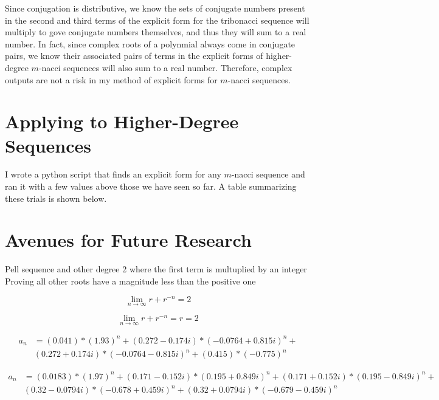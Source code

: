 \documentclass[11pt]{article}
\begin{document}
Since conjugation is distributive, we know the sets of conjugate numbers present in the second and third terms of the explicit form for the tribonacci sequence will multiply to gove conjugate numbers themselves, and thus they will sum to a real number. In fact, since complex roots of a polynmial always come in conjugate pairs, we know their associated pairs of terms in the explicit forms of higher-degree \(m\)-nacci sequences will also sum to a real number. Therefore, complex outputs are not a risk in my method of explicit forms for \(m\)-nacci sequences.



\section{Applying to Higher-Degree Sequences}
I wrote a python script that finds an explicit form for any \(m\)-nacci sequence and ran it with a few values above those we have seen so far. A table summarizing these trials is shown below. 


\section{Avenues for Future Research}
Pell sequence and other degree 2 where the first term is multuplied by an integer 
Proving all other roots have a magnitude less than the positive one

\newpage 

\[\lim_{n\to\infty}r+r^{-n}=2\]

\[\lim_{n\to\infty}r+r^{-n}=r=2\]

\begin{align*}
    a_n &= (0.041)*(1.93)^n + (0.272 - 0.174i)*(-0.0764 + 0.815i)^n + \\ &(0.272 + 0.174i)*(-0.0764 - 0.815i)^n + (0.415)*(-0.775)^n
\end{align*}

\begin{align*}
    a_n &= (0.0183)*(1.97)^n + (0.171 - 0.152i)*(0.195 + 0.849i)^n + (0.171 + 0.152i)*(0.195 - 0.849i)^n + \\ &(0.32 - 0.0794i)*(-0.678 + 0.459i)^n + (0.32 + 0.0794i)*(-0.679 - 0.459i)^n
\end{align*}
\end{document}

